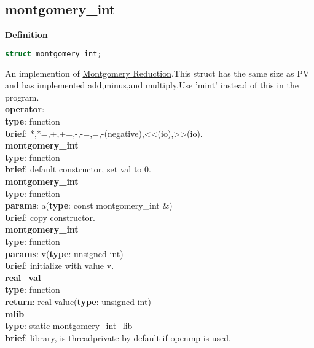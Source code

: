 \documentclass[8pt, a4paper, oneside, twocolumn]{article}
\begin{document}
\subsection{montgomery\_int}
\noindent \large \textbf{Definition} \normalsize
\begin{lstlisting}[language=c++]
struct montgomery_int;
\end{lstlisting}
An implemention of \href{https://en.wikipedia.org/wiki/Montgomery_modular_multiplication}{Montgomery Reduction}.This struct has the same size as PV and has implemented add,minus,and multiply.Use 'mint' instead of this in the program.\\
\textbf{operator}:\\
\indent\textbf{type}: function\\
\indent\textbf{brief}: *,*=,+,+=,-,-=,=,-(negative),<<(io),>>(io).\\
\textbf{montgomery\_int}\\
\indent\textbf{type}: function\\
\indent\textbf{brief}: default constructor, set val to $0$.\\
\textbf{montgomery\_int}\\
\indent\textbf{type}: function\\
\indent\textbf{params}: a(\textbf{type}: const montgomery\_int \&)\\
\indent\textbf{brief}: copy constructor.\\
\textbf{montgomery\_int}\\
\indent\textbf{type}: function\\
\indent\textbf{params}: v(\textbf{type}: unsigned int)\\
\indent\textbf{brief}: initialize with value v.\\
\textbf{real\_val}\\
\indent\textbf{type}: function\\
\indent\textbf{return}: real value(\textbf{type}: unsigned int)\\
\textbf{mlib}\\
\indent\textbf{type}: static montgomery\_int\_lib\\
\indent\textbf{brief}: library, is threadprivate by default if openmp is used.\\
\end{document}
